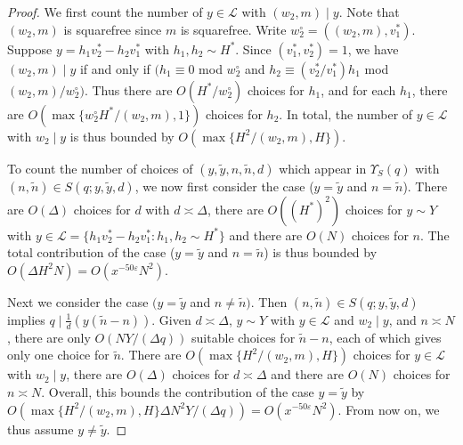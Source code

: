 \documentclass{amsart}
\numberwithin{equation}{section}
\begin{document}
\begin{proof}
 
 \vspace{3mm}
 We first count the number of $y \in \mathcal{L}$ with $(w_2,m) \mid y$. Note that $(w_2,m)$ is squarefree since $m$ is squarefree. Write $w_2^\circ = ((w_2,m),v_1^*)$. Suppose $y = h_1v_2^*-h_2v_1^*$ with $h_1, h_2 \sim H^*$. Since $(v_1^*,v_2^*)=1$, we have $(w_2,m) \mid y$ if and only if $( h_1  \equiv 0$ mod $w_2^\circ$ and $h_2  \equiv (v_2^*/v_1^*) h_1$ mod $(w_2,m)/w_2^\circ)$.  Thus there are $O(H^*/w_2^\circ)$ choices for $h_1$, and for each $h_1$, there are $O(\max\{w_2^\circ H^*/(w_2,m),1\})$ choices for $h_2$. In total, the number of $y \in \mathcal{L}$ with $w_2 \mid y$ is thus bounded by $O(\max\{H^2/(w_2,m),H\})$. 

\vspace{3mm}  To count the number of choices of $(y,\widetilde{y},n,\widetilde{n},d)$ which appear in $\Upsilon_S(q)$ with  $(n,\widetilde{n}) \in S(q;y,\widetilde{y},d)$, we now first  consider the case ($y = \widetilde{y}$ and $n = \widetilde{n}$). There are $O(\Delta)$ choices for $d$ with $d \asymp \Delta$, there are $O((H^*)^2)$ choices for $y \sim Y$ with $y \in \mathcal{L} = \{h_1 v_2^*-h_2 v_1^*: h_1, h_2 \sim H^*\}$ and there are $O(N)$ choices for $n$. The total contribution of the case   ($y = \widetilde{y}$ and $n = \widetilde{n}$) is thus bounded by $O( \Delta H^2 N) = O(x^{-50\varepsilon}  N^2)$. 

\vspace{3mm} Next we consider the case $(y = \widetilde{y}$ and $n \neq \widetilde{n})$. 
Then $(n,\widetilde{n}) \in S(q;y,\widetilde{y},d)$ implies $q \mid \frac{1}{d}(y(\widetilde{n}-n))$. Given $d \asymp \Delta$,  $y \sim Y$ with $y \in \mathcal{L}$ and $w_2 \mid y$, and $n \asymp N$, there are  only $O(NY/(\Delta q))  $ suitable choices for $\widetilde{n}-n$, each of which gives only one choice for $\widetilde{n}$. There are $O(\max\{H^2/(w_2,m),H\})$ choices for $y \in \mathcal{L}$ with $w_2 \mid y$,    there are $O(\Delta)$ choices for $d \asymp \Delta$ and there are $O(N)$ choices for $n \asymp N$. 
Overall, this bounds the contribution of the case $y = \widetilde{y}$ by $O(\max\{H^2/(w_2,m),H\}\Delta  N^2  Y/(\Delta q) ) = O(x^{-50\varepsilon}  N^2 ).   $ From now on, we thus assume $y \neq \widetilde{y}$. 


\end{proof}
\end{document}
